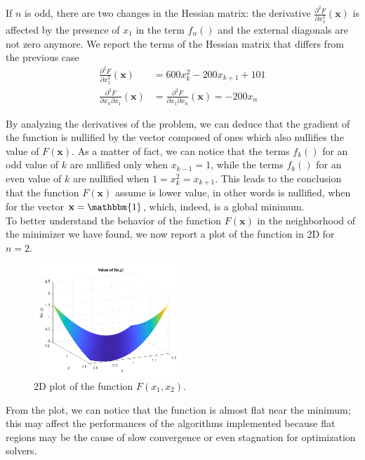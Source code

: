 If $n$ is odd, there are two changes in the Hessian matrix: the derivative $\frac{\partial^2 F}{\partial x_1^2} (\mathbf{x}) $ is affected by the presence of $x_1$ in the term $f_n()$ and the external diagonals are not zero anymore. We report the terms of the Hessian matrix that differs from the previous case
\begin{align*}
    \frac{\partial^2 F}{\partial x_1^2}  (\mathbf{x}) &= 600x_k^2 - 200x_{k+1} + 101 \\
    \frac{\partial^2 F}{\partial x_n \partial x_1} (\mathbf{x}) &= \frac{\partial^2 F}{\partial x_1 \partial x_n} (\mathbf{x}) = -200x_n
\end{align*}

By analyzing the derivatives of the problem, we can deduce that the gradient of the function is nullified by the vector composed of ones which also nullifies the value of $F(\mathbf{x})$. 
As a matter of fact, we can notice that the terms $f_k()$ for an odd value of $k$ are nullified only when $x_{k - 1} = 1$, while the terms $f_k()$ for an even value of $k$ are nullified when $1 = x_k^2 = x_{k+1}$. This leads to the conclusion that the function $F(\mathbf{x})$ assume is lower value, in other words is nullified, when for the vector $\mathbf{x} = \mathbbm{1}$, which, indeed, is a global minimum.
\\ To better understand the behavior of the function $F(\mathbf{x})$ in the neighborhood of the minimizer we have found, we now report a plot of the function in 2D for $n = 2$. 
\begin{figure}[htbp]
    \centering
    \includegraphics[width=0.5\textwidth]{img/pb25_fig.png}
    \caption{2D plot of the function $F(x_1, x_2)$.}
\end{figure}
From the plot, we can notice that the function is almost flat near the minimum; this may affect the performances of the algorithms implemented because flat regions may be the cause of slow convergence or even stagnation for optimization solvers. 

 
\medskip
